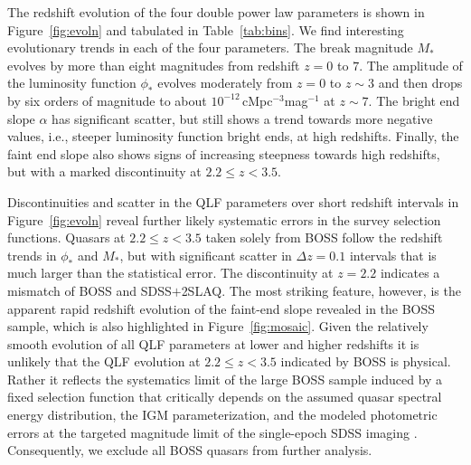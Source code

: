 \documentclass[fleqn,usenatbib]{mnras}
\begin{document}
The redshift evolution of the four double power law parameters is
shown in Figure~\ref{fig:evoln} and tabulated in Table~\ref{tab:bins}.
We find interesting evolutionary trends in each of the four
parameters.  The break magnitude $M_*$ evolves by more than eight
magnitudes from redshift $z=0$ to $7$.  The amplitude of the
luminosity function $\phi_*$ evolves moderately from $z=0$ to $z\sim
3$ and then drops by six orders of magnitude to about
$10^{-12}$\,cMpc$^{-3}$mag$^{-1}$ at $z\sim 7$.  The bright end slope
$\alpha$ has significant scatter,
but still shows a trend towards more
negative values, i.e., steeper luminosity function bright ends, at
high redshifts. Finally, the faint end slope also shows signs of
increasing steepness towards high redshifts, but with a marked discontinuity at $2.2\le z<3.5$.



Discontinuities and scatter in the QLF parameters over short redshift
intervals in Figure~\ref{fig:evoln} reveal further likely systematic
errors in the survey selection functions.  Quasars at $2.2\le z<3.5$
taken solely from BOSS \citep{2013ApJ...773...14R} follow the redshift
trends in $\phi_*$ and $M_*$, but with significant scatter in $\Delta
z=0.1$ intervals that is much larger than the statistical error.  The
discontinuity at $z=2.2$ indicates a mismatch of BOSS and
SDSS$+$2SLAQ. The most striking feature, however, is the apparent
rapid redshift evolution of the faint-end slope revealed in the BOSS
sample, which is also highlighted in Figure~\ref{fig:mosaic}. Given
the relatively smooth evolution of all QLF parameters at lower and
higher redshifts it is unlikely that the QLF evolution at $2.2\le
z<3.5$ indicated by BOSS is physical.  Rather it reflects the
systematics limit of the large BOSS sample induced by a fixed
selection function that critically depends on the assumed quasar
spectral energy distribution, the IGM parameterization,
and the modeled photometric errors at the targeted magnitude limit of the single-epoch SDSS imaging
\citep{2011ApJ...728...23W,2012ApJS..199....3R,2013ApJ...773...14R}.  Consequently, we
exclude all BOSS quasars from further analysis.
\end{document}
